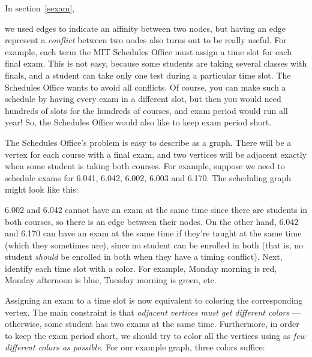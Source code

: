 
In section~\ref{sexam},

we used edges to indicate an affinity between two nodes, but having an
edge represent a \emph{conflict} between two nodes also turns out to be
really useful.  For example, each term the MIT Schedules Office must
assign a time slot for each final exam.  This is not easy, because some
students are taking several classes with finals, and a student can take
only one test during a particular time slot.  The Schedules Office wants
to avoid all conflicts.  Of course, you can make such a schedule by having
every exam in a different slot, but then you would need hundreds of slots
for the hundreds of courses, and exam period would run all year!  So, the
Schedules Office would also like to keep exam period short.

The Schedules Office's problem is easy to describe as a graph.  There
will be a vertex for each course with a final exam, and two vertices will
be adjacent exactly when some student is taking both courses.  For
example, suppose we need to schedule exams for 6.041, 6.042, 6.002, 6.003
and 6.170.  The scheduling graph might look like this:


6.002 and 6.042 cannot have an exam at the same time since there are
students in both courses, so there is an edge between their nodes.  On the
other hand, 6.042 and 6.170 can have an exam at the same time if they're
taught at the same time (which they sometimes are), since no student can
be enrolled in both (that is, no student \emph{should} be enrolled in both
when they have a timing conflict).  Next, identify each time slot with a
color.  For example, Monday morning is red, Monday afternoon is blue,
Tuesday morning is green, etc.

Assigning an exam to a time slot is now equivalent to coloring the
corresponding vertex.  The main constraint is that \emph{adjacent vertices
  must get different colors} ---otherwise, some student has two exams at
the same time.  Furthermore, in order to keep the exam period short, we
should try to color all the vertices using as \emph{few different colors
  as possible}.  For our example graph, three colors suffice:

